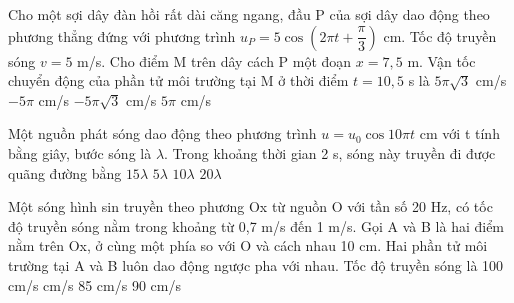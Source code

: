 \begin{ex}%
Cho một sợi dây đàn hồi rất dài căng ngang, đầu P của sợi dây dao động theo phương thẳng đứng với phương trình $u_P=5\cos(2\pi t + \dfrac{\pi}{3})$ cm. Tốc độ truyền sóng $v=5$ m/s. Cho điểm M trên dây cách P một đoạn $x=7,5$ m. Vận tốc chuyển động của phần tử môi trường tại M ở thời điểm $t=10,5$ s là
\choice
{$5\pi \sqrt{3}$ cm/s}
{$-5\pi$ cm/s}
{\True $-5\pi \sqrt{3}$ cm/s}
{$5\pi$ cm/s}

\end{ex} 
\begin{ex}%
Một nguồn phát sóng dao động theo phương trình $u=u_0\cos10\pi t$ cm với t tính bằng giây, bước sóng là $\lambda$. Trong khoảng thời gian 2 s, sóng này truyền đi được quãng đường bằng
\choice
{$15\lambda$}
{$5\lambda$}
{\True $10\lambda$}
{$20\lambda$}
\end{ex} 
\begin{ex}%
Một sóng hình sin truyền theo phương Ox từ nguồn O với tần số 20 Hz, có tốc độ truyền sóng nằm trong khoảng từ 0,7 m/s đến 1 m/s. Gọi A và B là hai điểm nằm trên Ox, ở cùng một phía so với O và cách nhau 10 cm. Hai phần tử môi trường tại A và B luôn dao động ngược pha với nhau. Tốc độ truyền sóng là
\choice
{100 cm/s}
{ cm/s}
{85 cm/s}
{90 cm/s}
\end{ex} 
